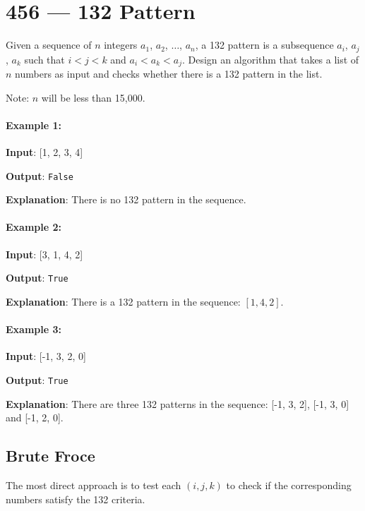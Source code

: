 \section{456 --- 132 Pattern}
Given a sequence of $n$ integers $a_1$, $a_2$, $\ldots$, $a_n$, a 132 pattern is a subsequence $a_i$, $a_j$, $a_k$ such that $i < j < k$ and $a_i < a_k < a_j$. Design an algorithm that takes a list of $n $ numbers as input and checks whether there is a 132 pattern in the list.

Note: $n$ will be less than 15,000.

\paragraph{Example 1:}

\begin{flushleft}
\textbf{Input}: [1, 2, 3, 4]

\textbf{Output}: \texttt{False}

\textbf{Explanation}: There is no 132 pattern in the sequence.
\end{flushleft}

\paragraph{Example 2:}

\begin{flushleft}
\textbf{Input}: [3, 1, 4, 2]

\textbf{Output}: \texttt{True}

\textbf{Explanation}: There is a 132 pattern in the sequence: $[1, 4, 2]$.
\end{flushleft}

\paragraph{Example 3:}

\begin{flushleft}
\textbf{Input}: [-1, 3, 2, 0]

\textbf{Output}: \texttt{True}

\textbf{Explanation}: There are three 132 patterns in the sequence: [-1, 3, 2], [-1, 3, 0] and [-1, 2, 0].

\end{flushleft}

\subsection{Brute Froce}
The most direct approach is to test each $(i,j,k)$ to check if the corresponding numbers satisfy the 132 criteria.

